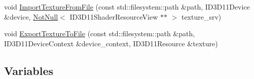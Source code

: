 \begin{DoxyCompactItemize}
\item 
void \mbox{\hyperlink{namespacemage_1_1rendering_1_1loader_a5a2ddb3f9d2c9e024e86abcde9ec7338}{Import\+Texture\+From\+File}} (const std\+::filesystem\+::path \&path, I\+D3\+D11\+Device \&device, \mbox{\hyperlink{namespacemage_a8769f9d670d6b585ea306cb1062af94b}{Not\+Null}}$<$ I\+D3\+D11\+Shader\+Resource\+View $\ast$$\ast$ $>$ texture\+\_\+srv)
\item 
void \mbox{\hyperlink{namespacemage_1_1rendering_1_1loader_aada60eb1aa912f803c4a9fddb82776b3}{Export\+Texture\+To\+File}} (const std\+::filesystem\+::path \&path, I\+D3\+D11\+Device\+Context \&device\+\_\+context, I\+D3\+D11\+Resource \&texture)
\end{DoxyCompactItemize}
\subsection*{Variables}
